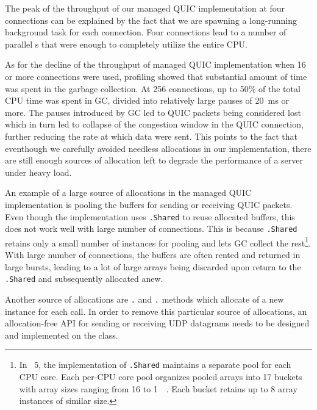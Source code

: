 The peak of the throughput of our managed QUIC implementation at four connections can be explained
by the fact that we are spawning a long-running background task for each connection. Four
connections lead to a number of parallel s that were enough to completely utilize the
entire CPU\@.

As for the decline of the throughput of managed QUIC implementation when 16 or more connections were
used, profiling showed that substantial amount of time was spent in the garbage collection. At 256
connections, up to 50\% of the total CPU time was spent in GC, divided into relatively large pauses
of \SI{20}{\milli\second} or more. The pauses introduced by GC led to QUIC packets being considered
lost which in turn led to collapse of the congestion window in the QUIC connection, further reducing
the rate at which data were sent. This points to the fact that eventhough we carefully avoided
needless allocations in our implementation, there are still enough sources of allocation left to
degrade the performance of a server under heavy load.

An example of a large source of allocations in the managed QUIC implementation is pooling the
buffers for sending or receiving QUIC packets. Even though the implementation uses
\ArrayPoolOf{\Byte}\texttt{.Shared} to reuse allocated buffers, this does not work well with large
number of connections. This is because \ArrayPoolOf{\Byte}\texttt{.Shared} retains only a small
number of \ArrayOf{\Byte} instances for pooling and lets GC collect the rest\footnote{In
  \dotnet{}~5, the implementation of \ArrayPoolOf{\Byte}\texttt{.Shared} maintains a separate pool
  for each CPU core. Each per-CPU core pool organizes pooled arrays into 17 buckets with array sizes
  ranging from \SI{16}{\byte} to \SI{1}{\mebi\byte}. Each bucket retains up to 8 array instances of
  similar size.}. With large number of connections, the buffers are often rented and returned in
large bursts, leading to a lot of large arrays being discarded upon return to the
\ArrayPoolOf{\Byte}\texttt{.Shared} and subsequently allocated anew.

Another source of allocations are \Socket{}\texttt{.} and
\Socket{}\texttt{.} methods which allocate of a new  instance
for each call. In order to remove this particular source of allocations, an allocation-free API for
sending or receiving UDP datagrams needs to be designed and implemented on the \Socket{} class.

